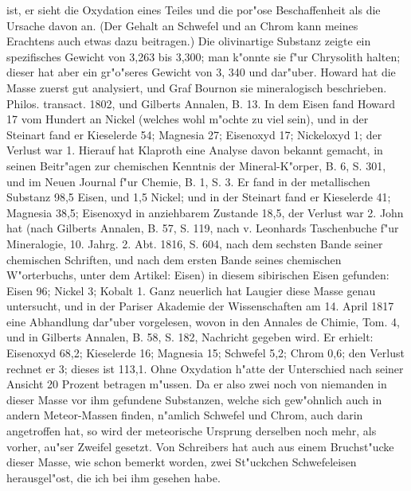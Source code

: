 \documentclass[a4paper, 11pt, oneside, polutonikogreek, german]{article}
\begin{document}
ist, er sieht die Oxydation eines Teiles und die por"ose Beschaffenheit als die Ursache davon an. (Der Gehalt an Schwefel und an Chrom kann meines Erachtens auch etwas dazu beitragen.) Die olivinartige Substanz zeigte ein spezifisches Gewicht von 3,263 bis 3,300; man k"onnte sie f"ur Chrysolith halten; dieser hat aber ein gr"o"seres Gewicht von 3, 340 und dar"uber. Howard hat die Masse zuerst gut analysiert, und Graf Bournon sie mineralogisch beschrieben. Philos. transact. 1802, und Gilberts Annalen, B. 13. In dem Eisen fand Howard 17 vom Hundert an Nickel (welches wohl m"ochte zu viel sein), und in der Steinart fand er Kieselerde 54; Magnesia 27; Eisenoxyd 17; Nickeloxyd 1; der Verlust war 1. Hierauf hat Klaproth eine Analyse davon bekannt gemacht, in seinen Beitr"agen zur chemischen Kenntnis der Mineral-K"orper, B. 6, S. 301, und im Neuen Journal f"ur Chemie, B. 1, S. 3. Er fand in der metallischen Substanz 98,5 Eisen, und 1,5 Nickel; und in der Steinart fand er Kieselerde 41; Magnesia 38,5; Eisenoxyd in anziehbarem Zustande 18,5, der Verlust war 2. John hat (nach Gilberts Annalen, B. 57, S. 119, nach v. Leonhards Taschenbuche f"ur Mineralogie, 10. Jahrg. 2. Abt. 1816, S. 604, nach dem sechsten Bande seiner chemischen Schriften, und nach dem ersten Bande seines chemischen W"orterbuchs, unter dem Artikel: Eisen) in diesem sibirischen Eisen gefunden: Eisen 96; Nickel 3; Kobalt 1. Ganz neuerlich hat Laugier diese Masse genau untersucht, und in der Pariser Akademie der Wissenschaften am 14. April 1817 eine Abhandlung dar"uber vorgelesen, wovon in den Annales de Chimie, Tom. 4, und in Gilberts Annalen, B. 58, S. 182, Nachricht gegeben wird. Er erhielt: Eisenoxyd 68,2; Kieselerde 16; Magnesia 15; Schwefel 5,2; Chrom 0,6; den Verlust rechnet er 3; dieses ist 113,1. Ohne Oxydation h"atte der Unterschied nach seiner Ansicht 20 Prozent betragen m"ussen. Da er also zwei noch von niemanden in dieser Masse vor ihm gefundene Substanzen, welche sich gew"ohnlich auch in andern Meteor-Massen finden, n"amlich Schwefel und Chrom, auch darin angetroffen hat, so wird der meteorische Ursprung derselben noch mehr, als vorher, au"ser Zweifel gesetzt. Von Schreibers hat auch aus einem Bruchst"ucke dieser Masse, wie schon bemerkt worden, zwei St"uckchen Schwefeleisen herausgel"ost, die ich bei ihm gesehen habe.
\end{document}
